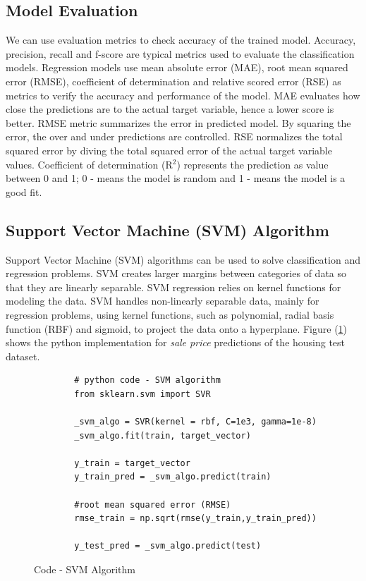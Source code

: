 \documentclass[sigconf]{acmart}
\begin{document}
	\subsection{Model Evaluation}
	We can use evaluation metrics to check accuracy of the trained model. Accuracy, precision, recall and f-score are typical metrics used to evaluate the classification models. Regression models use mean absolute error (MAE), root mean squared error (RMSE), coefficient of determination and relative scored error (RSE) as metrics to verify the accuracy and performance of the model. MAE evaluates how close the predictions are to the actual target variable, hence a lower score is better. RMSE metric summarizes the error in predicted model. By squaring the error, the over and under predictions are controlled. RSE normalizes the total squared error by diving the total squared error of the actual target variable values. Coefficient of determination (R$^2$) represents the prediction as value between 0 and 1; 0 - means the model is random and 1 - means the model is a good fit.
		
	\subsection{Support Vector Machine (SVM) Algorithm}
	
	Support Vector Machine (SVM) algorithms can be used to solve classification and regression problems. SVM creates larger margins between categories of data so that they are linearly separable. SVM regression relies on kernel functions for modeling the data. SVM handles non-linearly separable data, mainly for regression problems, using kernel functions, such as polynomial, radial basis function (RBF) and sigmoid, to project the data onto a hyperplane. Figure (\ref{c:svm}) shows the python implementation for {\em sale price} predictions of the housing test dataset.
	
	\begin{figure}[htb]	
		\begin{verbatim}	
		# python code - SVM algorithm
		from sklearn.svm import SVR	
		
		_svm_algo = SVR(kernel = rbf, C=1e3, gamma=1e-8)		
		_svm_algo.fit(train, target_vector)    
		
		y_train = target_vector
		y_train_pred = _svm_algo.predict(train)
		
		#root mean squared error (RMSE)
		rmse_train = np.sqrt(rmse(y_train,y_train_pred))
		
		y_test_pred = _svm_algo.predict(test)	
		\end{verbatim}
		\caption{Code - SVM Algorithm} \label{c:svm} 
	\end{figure}
	
\end{document}

